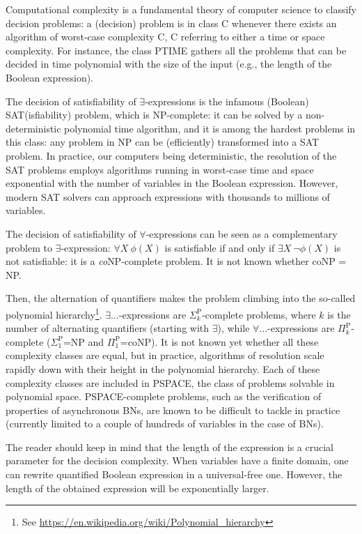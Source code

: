\documentclass[PCJ,Unicode,screen,mode=plain]{cedram}
\begin{document}
Computational complexity \citep{Papadimitriou} is a fundamental theory
of computer science to classify decision problems: a (decision) problem
is in class C whenever there exists an algorithm of worst-case
complexity C, C referring to either a time or space complexity. For
instance, the class PTIME gathers all the problems that can be decided
in time polynomial with the size of the input (e.g., the length of the
Boolean expression).

The decision of satisfiability of \(\exists\)-expressions is the
infamous (Boolean) SAT(isfiability) problem, which is NP-complete: it
can be solved by a non-deterministic polynomial time algorithm, and it
is among the hardest problems in this class: any problem in NP can be
(efficiently) transformed into a SAT problem. In practice, our computers
being deterministic, the resolution of the SAT problems employs
algorithms running in worst-case time and space exponential with the
number of variables in the Boolean expression. However, modern SAT
solvers can approach expressions with thousands to millions of
variables.

The decision of satisfiability of \(\forall\)-expressions can be seen as
a complementary problem to \(\exists\)-expression: \(\forall X~\phi(X)\)
is satisfiable if and only if \(\exists X~\neg\phi(X)\) is not
satisfiable: it is a \emph{co}NP-complete problem. It is not known
whether coNP = NP.

Then, the alternation of quantifiers makes the problem climbing into the
so-called polynomial hierarchy\footnote{See
  \url{https://en.wikipedia.org/wiki/Polynomial_hierarchy}}.
\(\exists\ldots\)-expressions are \(\Sigma_k^{\mathrm P}\)-complete
problems, where \(k\) is the number of alternating quantifiers (starting
with \(\exists\)), while \(\forall\ldots\)-expressions are
\(\Pi_k^{\mathrm P}\)-complete (\(\Sigma_1^{\mathrm P}\)=NP and
\(\Pi_1^{\mathrm P}\)=coNP). It is not known yet whether all these
complexity classes are equal, but in practice, algorithms of resolution
scale rapidly down with their height in the polynomial hierarchy. Each
of these complexity classes are included in PSPACE, the class of
problems solvable in polynomial space. PSPACE-complete problems, such as
the verification of properties of asynchronous BNs, are known to be
difficult to tackle in practice (currently limited to a couple of
hundreds of variables in the case of BNs).

The reader should keep in mind that the length of the expression is a
crucial parameter for the decision complexity. When variables have a
finite domain, one can rewrite quantified Boolean expression in a
universal-free one. However, the length of the obtained expression will
be exponentially larger.
\end{document}

